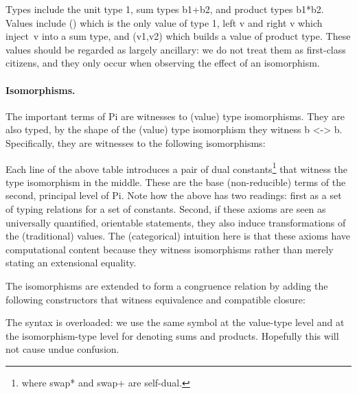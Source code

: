\documentclass{sigplanconf}
\begin{document}
\noindent 
Types include the unit type {{1}}, sum types {{b1+b2}}, and product types
{{b1*b2}}.  Values include {{()}} which is the only value of type {{1}},
{{left v}} and {{right v}} which inject~{{v}} into a sum type, and
{{(v1,v2)}} which builds a value of product type.  These values should be
regarded as largely ancillary: we do not treat them as first-class citizens,
and they only occur when observing the effect of an isomorphism.

\paragraph*{Isomorphisms.} The important terms of {{Pi}} are witnesses to
(value) type isomorphisms.  They are also typed, by the shape of the (value)
type isomorphism they witness {{b <-> b}}.  Specifically, they are witnesses
to the following isomorphisms:

\noindent Each line of the above table introduces a pair of dual
constants\footnote{where {{swap*}} and {{swap+}} are self-dual.} that witness
the type isomorphism in the middle.  These are the base (non-reducible) terms
of the second, principal level of {{Pi}}. Note how the above has two
readings: first as a set of typing relations for a set of constants. Second,
if these axioms are seen as universally quantified, orientable statements,
they also induce transformations of the (traditional) values. The
(categorical) intuition here is that these axioms have computational content
because they witness isomorphisms rather than merely stating an extensional
equality.

The isomorphisms are extended to form a congruence relation by adding the
following constructors that witness equivalence and compatible closure:

%
%
%
\noindent The syntax is overloaded: we use the same symbol at the value-type level
and at the isomorphism-type level for denoting sums and products.  Hopefully
this will not cause undue confusion.
\end{document}
